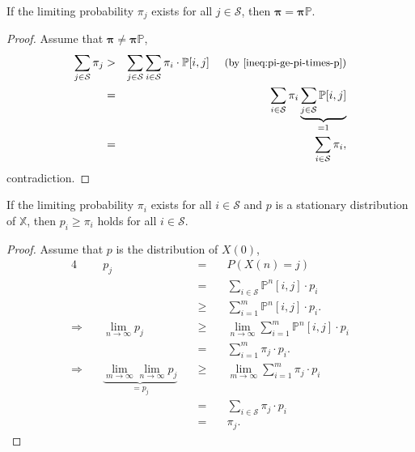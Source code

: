 \begin{equality} \label{eq:pi-eq-pi-times-p}
If the limiting probability $ \pi_{j} $ exists for all $ j \in \mathcal{S} $, then $ \boldsymbol\pi = \boldsymbol\pi \mathbb{P} $.

\begin{proof}
Assume that $ \boldsymbol\pi \neq \boldsymbol\pi \mathbb{P} $,
\begin{eqnarray*}
\sum_{j \in \mathcal{S}} \pi_{j}
  & > & \sum_{j \in \mathcal{S}} \sum_{i \in \mathcal{S}} \pi_{i} \cdot \mathbb{P}[i, j]
    \text{\hspace{1em} \small(by \autoref{ineq:pi-ge-pi-times-p})} \\
  & = & \sum_{i \in \mathcal{S}} \pi_{i} \underbrace{\sum_{j \in \mathcal{S}} \mathbb{P}[i, j]}_{= 1} \\
  & = & \sum_{i \in \mathcal{S}} \pi_{i},
\end{eqnarray*}
contradiction.
\end{proof}
\end{equality}

\begin{inequality} \label{ineq:p-ge-pi}
If the limiting probability $ \pi_{i} $ exists for all $ i \in \mathcal{S} $ and $ p $ is a stationary distribution of $ \mathbb{X} $, then $ p_{i} \ge \pi_{i} $ holds for all $ i \in \mathcal{S} $.

\begin{proof}
Assume that $ p $ is the distribution of $ X(0) $,
\begin{alignat*}{4}
  & p_{j}
    & \quad=\quad & P(X(n) = j) \\
  & & \quad=\quad & \sum_{i \in \mathcal{S}} \mathbb{P}^{n}[i, j] \cdot p_{i} \\
  & & \quad\ge\quad & \sum_{i = 1}^{m} \mathbb{P}^{n}[i, j] \cdot p_{i}. \\
\Rightarrow\quad
  & \lim_{n \to \infty} p_{j}
    & \quad\ge\quad & \lim_{n \to \infty} \sum_{i = 1}^{m} \mathbb{P}^{n}[i, j] \cdot p_{i} \\
  & & \quad=\quad & \sum_{i = 1}^{m} \pi_{j} \cdot p_{i}. \\
\Rightarrow\quad
  & \underbrace{\lim_{m \to \infty} \lim_{n \to \infty} p_{j}}_{= p_{j}}
    & \quad\ge\quad & \lim_{m \to \infty} \sum_{i = 1}^{m} \pi_{j} \cdot p_{i} \\
  & & \quad=\quad & \sum_{i \in \mathcal{S}} \pi_{j} \cdot p_{i} \\
  & & \quad=\quad & \pi_{j}.
\end{alignat*}
\end{proof}
\end{inequality}


